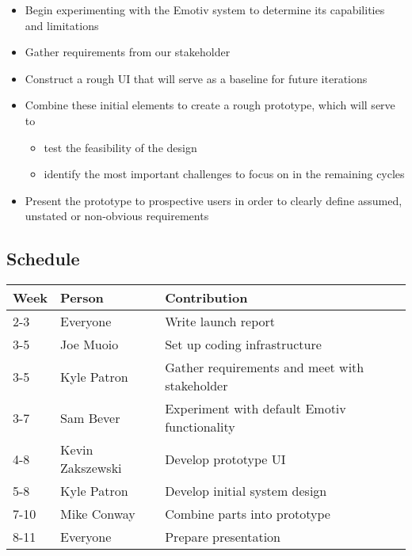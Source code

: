 \documentclass{report}
\begin{document}
\begin{itemize}
    \item Begin experimenting with the Emotiv system to determine its
capabilities and limitations
    \item Gather requirements from our stakeholder
    \item Construct a rough UI that will serve as a baseline for future
iterations
    \item Combine these initial elements to create a rough prototype, which
will serve to
        \begin{itemize}
            \item test the feasibility of the design
            \item identify the most important challenges to focus on in the
                remaining cycles
        \end{itemize}
    \item Present the prototype to prospective users in order to clearly
        define assumed, unstated or non-obvious requirements
\end{itemize}

\subsection*{Schedule}

\begin{tabular}{| l | l | l |}
    \hline
    Week & Person & Contribution \\
    \hline \hline

    2-3 & Everyone & Write launch report \\ \hline
    3-5 & Joe Muoio & Set up coding infrastructure \\ \hline
    3-5 & Kyle Patron & Gather requirements and meet with stakeholder \\ \hline
    3-7 & Sam Bever & Experiment with default Emotiv functionality \\ \hline
    4-8 & Kevin Zakszewski & Develop prototype UI \\ \hline
	5-8 & Kyle Patron & Develop initial system design \\ \hline
    7-10 & Mike Conway & Combine parts into prototype \\ \hline
    8-11 & Everyone & Prepare presentation \\ \hline
\end{tabular}
\end{document}
